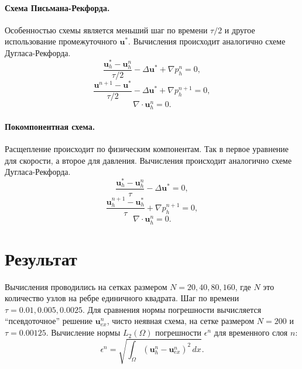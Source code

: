 \documentclass[12pt]{article}
\begin{document}
\paragraph{Схема Письмана-Рекфорда.} Особенностью схемы является меньший шаг по времени $\tau/2$ и другое использование промежуточного ${\bm u}^*$. Вычисления происходит аналогично схеме Дугласа-Рекфорда.
$$
\frac{{\bm u}_h^{*}-{\bm u}_h^n}{\tau/2} - \Delta {\bm u}^{*}+\nabla p_h^n=0,
$$
$$
\frac{{\bm u}^{n+1}-{\bm u}^{*}}{\tau/2} - \Delta {\bm u}^{*}+\nabla p_h^{n+1}=0,
$$
$$
\nabla \cdot {\bm u}_h^n = 0.
$$

\paragraph{Покомпонентная схема.} Расщепление происходит по физическим компонентам. Так в первое уравнение для скорости, а второе для давления. Вычисления происходит аналогично схеме Дугласа-Рекфорда.
$$
\frac{{\bm u}_h^{*}-{\bm u}_h^n}{\tau} - \Delta{\bm u}^{*}=0,
$$
$$
\frac{{\bm u}_h^{n+1}-{\bm u}_h^{*}}{\tau} + \nabla p_h^{n+1}=0,
$$
$$
\nabla \cdot {\bm u}_h^n = 0.
$$


\section{Результат}
Вычисления проводились на сетках размером $N = 20, 40, 80, 160$, где $N$ это количество узлов на ребре единичного квадрата. Шаг по времени $\tau = 0.01, 0.005, 0.0025$. Для сравнения нормы погрешности вычисляется ``псевдоточное'' решение ${\bm u}_{ex}^n$, чисто неявная схема, на сетке размером $N=200$ и $\tau=0.00125$.
Вычисление нормы $L_2(\Omega)$ погрешности $\epsilon^n$ для временного слоя $n$:
$$
\epsilon^n = \sqrt{\int_{\Omega} ({\bm u}_h^n - {\bm u}_{ex}^n )^2 \, dx}.
$$
\end{document}
